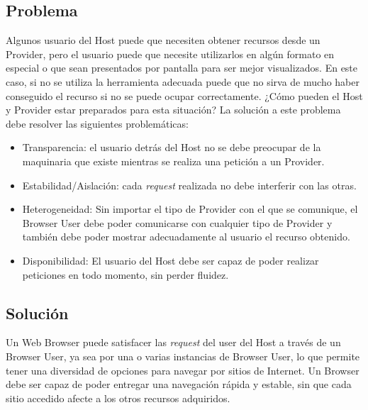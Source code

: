 \subsection{Problema}
Algunos usuario del Host puede que necesiten obtener recursos desde un Provider, pero el usuario puede que necesite utilizarlos en algún formato en especial o que sean presentados por pantalla para ser mejor visualizados. En este caso, si no se utiliza la herramienta adecuada puede que no sirva de mucho haber conseguido el recurso si no se puede ocupar correctamente. ¿Cómo pueden el Host y Provider estar preparados para esta situación?
La solución a este problema debe resolver las siguientes problemáticas:
\begin{itemize}
	\item Transparencia: el usuario detrás del Host no se debe preocupar de la maquinaria que existe mientras se realiza una petición a un Provider.
	\item Estabilidad/Aislación: cada \textit{request} realizada no debe interferir con las otras.
	\item Heterogeneidad: Sin importar el tipo de Provider con el que se comunique, el Browser User debe poder comunicarse con cualquier tipo de Provider y también debe poder mostrar adecuadamente al usuario el recurso obtenido.
	\item Disponibilidad: El usuario del Host debe ser capaz de poder realizar peticiones en todo momento, sin perder fluidez.
\end{itemize}

\subsection{Solución}
Un Web Browser puede satisfacer las \textit{request} del user del Host a través de un Browser User, ya sea por una o varias instancias de Browser User, lo que permite tener una diversidad de opciones para navegar por sitios de Internet. Un Browser debe ser capaz de poder entregar una navegación rápida y estable, sin que cada sitio accedido afecte a los otros recursos adquiridos.

